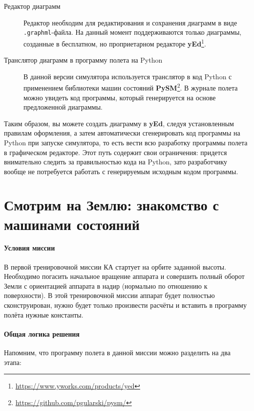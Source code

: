 \documentclass[12pt,a4paper]{article}
\begin{document}
\begin{description}
\item[Редактор диаграмм] Редактор необходим для редактирования и сохранения диаграмм в
  виде \verb'.graphml'-файла. На данный момент поддерживаются только диаграммы, созданные
  в бесплатном, но проприетарном редакторе
  \textbf{yEd}\footnote{\url{https://www.yworks.com/products/yed}}.
\item[Транслятор диаграмм в программу полета на Python] В данной версии симулятора
  используется транслятор в код Python с применением библиотеки машин состояний
  \textbf{PySM}\footnote{\url{https://github.com/pgularski/pysm/}}. В журнале полета можно
  увидеть код программы, который генерируется на основе предложенной диаграммы.
\end{description}

Таким образом, вы можете создать диаграмму в \textbf{yEd}, следуя установленным правилам
оформления, а затем автоматически сгенерировать код программы на Python при запуске
симулятора, то есть вести всю разработку программы полета в графическом редакторе. Этот
путь содержит свои ограничения: придется внимательно следить за правильностью кода на
Python, зато разработчику вообще не потребуется работать с генерируемым исходным кодом
программы.

\clearpage
\section{Смотрим на Землю: знакомство с машинами состояний}

\paragraph{Условия миссии} В первой тренировочной миссии КА стартует на орбите заданной высоты. Необходимо погасить
начальное вращение аппарата и совершить полный оборот Земли с ориентацией аппарата в надир
(нормально по отношению к поверхности). В этой тренировочной миссии аппарат будет
полностью сконструирован, нужно будет только произвести расчёты и вставить в программу
полёта нужные константы.

\paragraph{Общая логика решения} Напомним, что программу полета в данной миссии можно разделить на два этапа:
\end{document}
